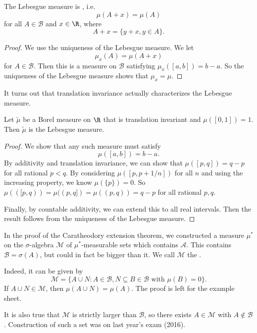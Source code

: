 \documentclass[a4paper]{article}
\begin{document}
\begin{prop}
  The Lebesgue measure is , i.e.
  \[
    \mu(A + x) = \mu(A)
  \]
  for all $A \in \mathcal{B}$ and $x \in \R$, where
  \[
    A + x = \{y + x, y \in A\}.
  \]
\end{prop}

\begin{proof}
  We use the uniqueness of the Lebesgue measure. We let
  \[
    \mu_x (A) = \mu(A + x)
  \]
  for $A \in \mathcal{B}$. Then this is a measure on $\mathcal{B}$ satisfying $\mu_x([a, b]) = b - a$. So the uniqueness of the Lebesgue measure shows that $\mu_x = \mu$.
\end{proof}

It turns out that translation invariance actually characterizes the Lebesgue measure.

\begin{prop}
  Let $\tilde{\mu}$ be a Borel measure on $\R$ that is translation invariant and $\mu([0, 1]) = 1$. Then $\tilde{\mu}$ is the Lebesgue measure.
\end{prop}

\begin{proof}
  We show that any such measure must satisfy
  \[
    \mu([a, b]) = b - a.
  \]
  By additivity and translation invariance, we can show that $\mu([p, q]) = q - p$ for all rational $p < q$. By considering $\mu([p, p + 1/n])$ for all $n$ and using the increasing property, we know $\mu(\{p\}) = 0$. So $\mu(([p, q)) = \mu((p, q]) = \mu((p, q)) = q - p$ for all rational $p, q$.

  Finally, by countable additivity, we can extend this to all real intervals. Then the result follows from the uniqueness of the Lebesgue measure.
\end{proof}

In the proof of the Caratheodory extension theorem, we constructed a measure $\mu^*$ on the $\sigma$-algebra $\mathcal{M}$ of $\mu^*$-measurable sets which contains $\mathcal{A}$. This contains $\mathcal{B} = \sigma(A)$, but could in fact be bigger than it. We call $\mathcal{M}$ the .

Indeed, it can be given by
\[
  \mathcal{M} = \{A \cup N: A \in \mathcal{B}, N \subseteq B \in \mathcal{B}\text{ with }\mu(B) = 0\}.
\]
If $A \cup N \in \mathcal{M}$, then $\mu(A \cup N) = \mu(A)$. The proof is left for the example sheet.

It is also true that $\mathcal{M}$ is strictly larger than $\mathcal{B}$, so there exists $A \in \mathcal{M}$ with $A \not\in \mathcal{B}$. Construction of such a set was on last year's exam (2016).
\end{document}
